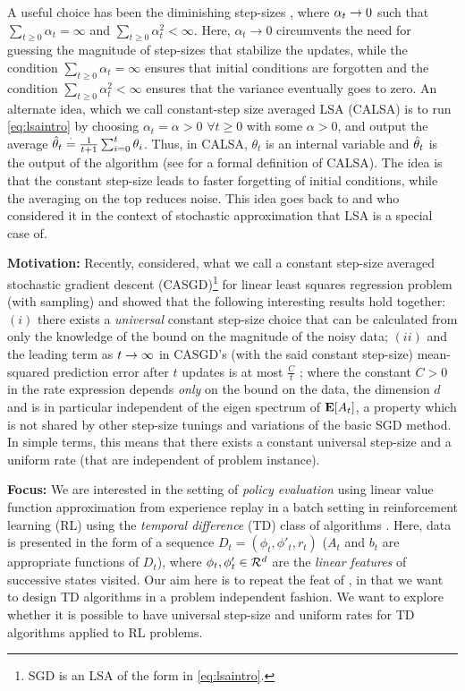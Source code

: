 A useful choice has been the diminishing step-sizes \cite{gtd2,gtdmp,konda-tsitsiklis}, where $\alpha_t\rightarrow 0$ such that $\sum_{t\geq 0} \alpha_t=\infty$ and $\sum_{t\geq 0} \alpha^2_t<\infty$. Here, $\alpha_t\to0$ circumvents the need for guessing the magnitude of step-sizes that stabilize the updates, while the condition $\sum_{t\geq 0} \alpha_t=\infty$ ensures that initial conditions are forgotten and the condition  $\sum_{t\geq 0} \alpha^2_t<\infty$ ensures that the variance eventually goes to zero.  An alternate idea, which we call constant-step size averaged LSA (CALSA) is to run \eqref{eq:lsaintro} by choosing $\alpha_t=\alpha>0$ $\forall t\geq 0$ with some $\alpha>0$, and output the average $\hat{\theta}_t\stackrel{\cdot}{=}\frac{1}{t+1}\sum_{i=0}^t \theta_i$. Thus, in CALSA, $\theta_t$ is an internal variable and $\hat{\theta}_t$ is the output of the algorithm (see  for a formal definition of CALSA). The idea is that the constant step-size leads to faster forgetting of initial conditions, while the averaging on the top reduces noise. This idea goes back to  \citet{ruppert} and \citet{polyak-judisky} who considered it in the context of stochastic approximation that LSA is a special case of. 

\textbf{Motivation:} Recently, \citet{bach} considered, what we call a constant step-size averaged stochastic gradient descent (CASGD)\footnote{SGD is an LSA of the form in \eqref{eq:lsaintro}.}  for linear least squares regression problem (with \iid sampling) and showed that the following interesting results hold together: $(i)$ there exists a \emph{universal} constant step-size choice that can be calculated from only the knowledge of the bound on the magnitude of the noisy data; $(ii)$ and the leading term as $t\rightarrow\infty$ in CASGD's (with the said constant step-size) mean-squared prediction error after $t$ updates is at most $\frac{C}{t}$ ; where the constant $C>0$ in the rate expression depends \emph{only} on the bound on the data, the dimension $d$ and is in particular independent of the eigen spectrum of $\mathbf{E}[A_t]$, a property which is not shared by other step-size tunings and variations of the basic SGD method. In simple terms, this means that there exists a constant universal step-size  and a uniform rate (that are independent of problem instance).

\textbf{Focus:} We are interested in the setting of \emph{policy evaluation} \cite{dann} using linear value function approximation from experience replay \cite{lin} in a batch setting \cite{lange} in reinforcement learning (RL)  using the \emph{temporal difference} (TD) class of algorithms \cite{sutton,konda-tsitsiklis,gtd,gtd2,gtdmp}. Here, data is presented in the form of a sequence $D_t=(\phi_t,\phi'_t,r_t)$ ($A_t$ and $b_t$ are appropriate functions of $D_t$), where $\phi_t,\phi'_t\in \mathcal{R}^d$ are the \emph{linear features} of successive states visited. Our aim here is to repeat the feat of \cite{bach}, in that we want to design TD algorithms in a problem independent fashion. We want to explore whether it is possible to have universal step-size and uniform rates for TD algorithms applied to RL problems.

